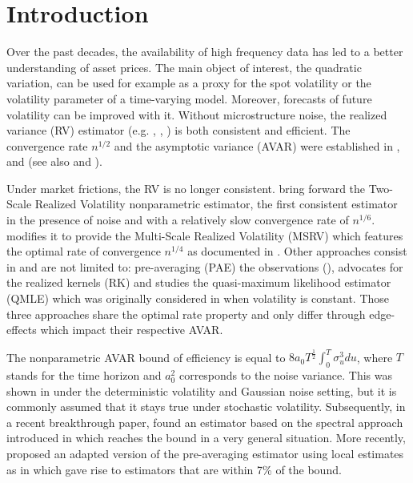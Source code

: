 \documentclass[11pt]{article}
\numberwithin{equation}{section}
\theoremstyle{plain}
\theoremstyle{remark}
\begin{document}
\section{Introduction} \label{introduction}
Over the past decades, the availability of high frequency data has led to a better understanding of asset prices. The main object of interest, the quadratic variation, can be used for example as a proxy for the spot volatility or the volatility parameter of a time-varying model. Moreover, forecasts of future volatility can be improved with it. Without microstructure noise, the realized variance (RV) estimator (e.g. \cite{andersen2001distribution}, \cite{meddahi2002theoretical}, \cite{barndorff2002estimating}) is both consistent and efficient. The convergence rate $n^{1/2}$ and the asymptotic variance (AVAR) were established in \cite{genon1993estimation}, \cite{jacod1994limit} and \cite{jacod1998asymptotic} (see also \cite{zhang2001martingales} and \cite{mykland2006anova}).

\smallskip 
Under market frictions, the RV is no longer consistent. \cite{zhang2005tale} bring forward the Two-Scale Realized Volatility nonparametric estimator, the first consistent estimator in the presence of noise and with a relatively slow convergence rate of $n^{1/6}$. \cite{zhang2006efficient} modifies it to provide the Multi-Scale Realized Volatility (MSRV) which features the optimal rate of convergence $n^{1/4}$ as documented in \cite{gloter2001diffusions}. Other approaches consist in and are not limited to: pre-averaging (PAE) the observations (\cite{jacod2009microstructure}), \cite{barndorff2008designing} advocates for the realized kernels (RK) and \cite{xiu2010quasi} studies the quasi-maximum likelihood estimator (QMLE) which was originally considered in \cite{ait2005often} when volatility is constant. Those three approaches share the optimal rate property and only differ through edge-effects which impact their respective AVAR. 

\smallskip 
The nonparametric AVAR bound of efficiency is equal to $8 a_0 T^{\frac{1}{2}} \int_0^T \sigma_u^3 du$, where $T$ stands for the time horizon and $a_0^2$ corresponds to the noise variance. This was shown in \cite{reiss2011asymptotic} under the deterministic volatility and Gaussian noise setting, but it is commonly assumed that it stays true under stochastic volatility.  Subsequently, in a recent breakthrough
paper, \cite{altmeyer2015functional} found an estimator based on the spectral approach introduced in \cite{reiss2011asymptotic} which reaches the bound in a very general situation.  More recently, \cite{jacod2015microstructure} proposed an adapted version of the pre-averaging estimator using local estimates as in \cite{reiss2011asymptotic} which gave rise to estimators that are within 7\% of the bound.
\end{document}
